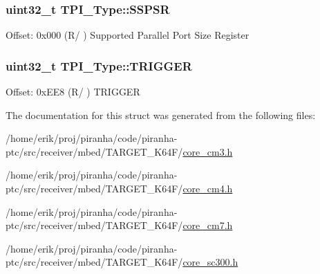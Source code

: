 \subsubsection[{\texorpdfstring{S\+S\+P\+SR}{SSPSR}}]{ uint32\+\_\+t T\+P\+I\+\_\+\+Type\+::\+S\+S\+P\+SR}\hypertarget{structTPI__Type_a158e9d784f6ee6398f4bdcb2e4ca0912}{}\label{structTPI__Type_a158e9d784f6ee6398f4bdcb2e4ca0912}
Offset\+: 0x000 (R/ ) Supported Parallel Port Size Register 
\subsubsection[{\texorpdfstring{T\+R\+I\+G\+G\+ER}{TRIGGER}}]{ uint32\+\_\+t T\+P\+I\+\_\+\+Type\+::\+T\+R\+I\+G\+G\+ER}\hypertarget{structTPI__Type_aa4b603c71768dbda553da571eccba1fe}{}\label{structTPI__Type_aa4b603c71768dbda553da571eccba1fe}
Offset\+: 0x\+E\+E8 (R/ ) T\+R\+I\+G\+G\+ER 

The documentation for this struct was generated from the following files\+:\begin{DoxyCompactItemize}
\item 
/home/erik/proj/piranha/code/piranha-\/ptc/src/receiver/mbed/\+T\+A\+R\+G\+E\+T\+\_\+\+K64\+F/\hyperlink{core__cm3_8h}{core\+\_\+cm3.\+h}\item 
/home/erik/proj/piranha/code/piranha-\/ptc/src/receiver/mbed/\+T\+A\+R\+G\+E\+T\+\_\+\+K64\+F/\hyperlink{core__cm4_8h}{core\+\_\+cm4.\+h}\item 
/home/erik/proj/piranha/code/piranha-\/ptc/src/receiver/mbed/\+T\+A\+R\+G\+E\+T\+\_\+\+K64\+F/\hyperlink{core__cm7_8h}{core\+\_\+cm7.\+h}\item 
/home/erik/proj/piranha/code/piranha-\/ptc/src/receiver/mbed/\+T\+A\+R\+G\+E\+T\+\_\+\+K64\+F/\hyperlink{core__sc300_8h}{core\+\_\+sc300.\+h}\end{DoxyCompactItemize}
